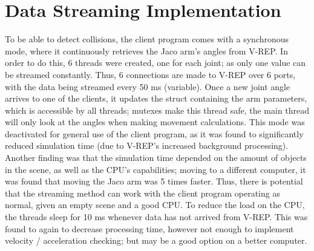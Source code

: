 \documentclass[12pt,openany,a4paper]{book}
\newcommand{\fig}[1]  {Fig.\,\ref{#1}}		%
\begin{document}
\section{Data Streaming Implementation}
To be able to detect collisions, the client program comes with a synchronous mode, where it continuously retrieves the Jaco arm's angles from V-REP. In order to do this, 6 threads were created, one for each joint; as only one value can be streamed constantly. Thus, 6 connections are made to V-REP over 6 ports, with the data being streamed every 50 ms (variable). Once a new joint angle arrives to one of the clients, it updates the struct containing the arm parameters, which is accessible by all threads; mutexes make this thread safe, the main thread will only look at the angles when making movement calculations. This mode was deactivated for general use of the client program, as it was found to significantly reduced simulation time (due to V-REP's increased background processing). Another finding was that the simulation time depended on the amount of objects in the scene, as well as the CPU's capabilities; moving to a different computer, it was found that moving the Jaco arm was 5 times faster. Thus, there is potential that the streaming method can work with the client program operating as normal, given an empty scene and a good CPU. To reduce the load on the CPU, the threads sleep for 10 ms whenever data has not arrived from V-REP. This was found to again to decrease processing time, however not enough to implement velocity / acceleration checking; but may be a good option on a better computer. 


%
\end{document}
